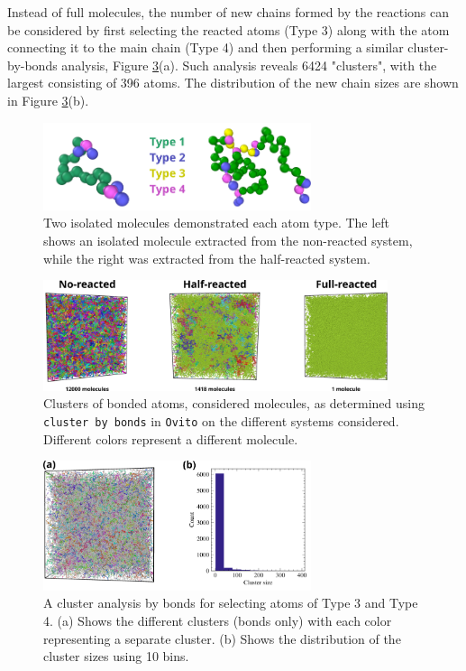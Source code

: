 \documentclass[10pt,a4paper]{labreport}
\begin{document}
\begin{enumerate}
  Instead of full molecules, the number of new chains formed by the reactions can be considered by first selecting the reacted atoms (Type 3) along with the atom connecting it to the main chain (Type 4) and then performing a similar cluster-by-bonds analysis, Figure \ref{fig:ass1_full_reaction}(a). 
  Such analysis reveals 6424 "clusters", with the largest consisting of 396 atoms. The distribution of the new chain sizes are shown in Figure \ref{fig:ass1_full_reaction}(b).

  \begin{figure}[htbp]
    \centering 
    \includegraphics[width = 0.7\textwidth]{figs/ass1_molecules.png}
    \caption{Two isolated molecules demonstrated each atom type. The left shows an isolated molecule extracted from the non-reacted system, while the right was extracted from the half-reacted system.}
    \label{fig:ass1_molecules}
  \end{figure}
  \begin{figure}[htbp]
    \centering 
    \includegraphics[width = 0.9\textwidth]{figs/ass1_molecule_clusters.png}
    \caption{Clusters of bonded atoms, considered molecules, as determined using \texttt{cluster by bonds} in \texttt{Ovito} on the different systems considered. Different colors represent a different molecule.}
    \label{fig:cluster_analysis}
  \end{figure}
  \begin{figure}[htbp]
    \centering 
    \includegraphics[width = 0.7\textwidth]{figs/ass1_full-reaciton.png}
    \caption{A cluster analysis by bonds for selecting atoms of Type 3 and Type 4. (a) Shows the different clusters (bonds only) with each color representing a separate cluster. (b) Shows the distribution of the cluster sizes using 10 bins. }
    \label{fig:ass1_full_reaction}
  \end{figure}
  
\end{enumerate}
\end{document}
